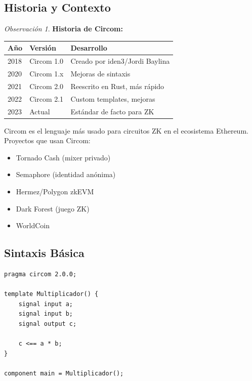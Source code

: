 \documentclass[11pt,a4paper,twoside,openright]{book}
\theoremstyle{definition}
\theoremstyle{plain}
\theoremstyle{remark}
\newtheorem{remark}{Observación}[chapter]
\begin{document}
\subsection{Historia y Contexto}

\begin{remark}
\textbf{Historia de Circom:}

\begin{center}
\begin{tabular}{lll}
\toprule
\textbf{Año} & \textbf{Versión} & \textbf{Desarrollo} \\
\midrule
2018 & Circom 1.0 & Creado por iden3/Jordi Baylina \\
2020 & Circom 1.x & Mejoras de sintaxis \\
2021 & Circom 2.0 & Reescrito en Rust, más rápido \\
2022 & Circom 2.1 & Custom templates, mejoras \\
2023 & Actual & Estándar de facto para ZK \\
\bottomrule
\end{tabular}
\end{center}

Circom es el lenguaje más usado para circuitos ZK en el ecosistema Ethereum. Proyectos que usan Circom:
\begin{itemize}
    \item Tornado Cash (mixer privado)
    \item Semaphore (identidad anónima)
    \item Hermez/Polygon zkEVM
    \item Dark Forest (juego ZK)
    \item WorldCoin
\end{itemize}
\end{remark}

\subsection{Sintaxis Básica}

\begin{verbatim}
pragma circom 2.0.0;

template Multiplicador() {
    signal input a;
    signal input b;
    signal output c;
    
    c <== a * b;
}

component main = Multiplicador();
\end{verbatim}
\end{document}
